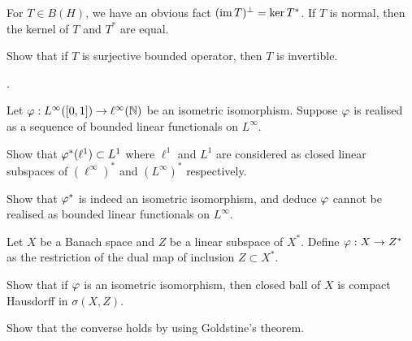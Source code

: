 \documentclass[a4paper,12pt]{report}
\begin{document}
\begin{prb}
For $T\in B(H)$, we have an obvious fact $(\operatorname{im} T)^\perp=\ker T^*$.
If $T$ is normal, then the kernel of $T$ and $T^*$ are equal.
\begin{parts}
\item
Show that if $T$ is surjective bounded operator, then $T$ is invertible.
\end{parts}
\end{prb}


\begin{prb}
.
\end{prb}


\begin{prb}
Let $\varphi:L^\infty([0,1])\to\ell^\infty(\mathbb{N})$ be an isometric isomorphism.
Suppose $\varphi$ is realised as a sequence of bounded linear functionals on $L^\infty$.
\begin{parts}
\item
Show that $\varphi^*(\ell^1)\subset L^1$ where $\ell^1$ and $L^1$ are considered as closed linear subspaces of $(\ell^\infty)^*$ and $(L^\infty)^*$ respectively.
\item Show that $\varphi^*$ is indeed an isometric isomorphism, and deduce $\varphi$ cannot be realised as bounded linear functionals on $L^\infty$.
\end{parts}
\end{prb}


\begin{prb}
Let $X$ be a Banach space and $Z$ be a linear subspace of $X^*$.
Define $\varphi:X\to Z^*$ as the restriction of the dual map of inclusion $Z\subset X^*$.
\begin{parts}
\item
Show that if $\varphi$ is an isometric isomorphism, then closed ball of $X$ is compact Hausdorff in $\sigma(X,Z)$.
\item Show that the converse holds by using Goldstine's theorem.
\end{parts}
\end{prb}
\end{document}
